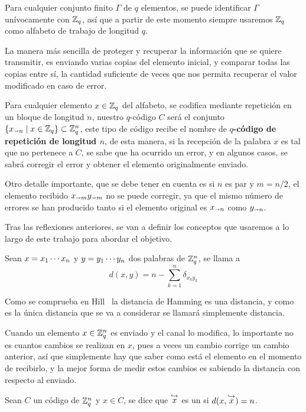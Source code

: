 Para cualquier conjunto finito $\Gamma$ de $q$ elementos, se puede identificar $\Gamma$ unívocamente con $\mathbb{Z}_q$, así que a partir de este momento siempre usaremos $\mathbb{Z}_q$ como alfabeto de trabajo de longitud $q$.

La manera más sencilla de proteger y recuperar la información que se quiere transmitir, es enviando varias copias del elemento inicial, y comparar todas las copias entre sí, la cantidad suficiente de veces que nos permita recuperar el valor modificado en caso de error.

Para cualquier elemento $x\in\mathbb{Z}_q$ del alfabeto, se codifica mediante repetición en un bloque de longitud $n$, nuestro $q$-código $C$ será el conjunto $\left\{x_{\shortrightarrow n}\mid x\in\mathbb{Z}_q\right\}\subset \mathbb{Z}_q^n$, este tipo de código recibe el nombre de \textbf{$q$-código de repetición de longitud $n$}, de esta manera, si la recepción de la palabra $x$ es tal que no pertenece a $C$, se sabe que ha ocurrido un error, y en algunos casos, se sabrá corregir el error y obtener el elemento originalmente enviado.

Otro detalle importante, que se debe tener en cuenta es si $n$ es par y $m=n/2$, el elemento recibido $x_{\shortrightarrow m}y_{\shortrightarrow m}$ no se puede corregir, ya que el mismo número de errores se han producido tanto si el elemento original es $x_{\shortrightarrow n}$ como $y_{\shortrightarrow n}$.

Tras las reflexiones anteriores, se van a definir los conceptos que usaremos a lo largo de este trabajo para abordar el objetivo.

\begin{definition}
	Sean $x=x_1\cdots x_{n}$ y $y=y_1\cdots y_{n}$ dos palabras de $\mathbb{Z}_q^n$, se llama  a
	\[
		d(x, y) = n-\sum_{k=1}^n \delta_{x_k y_k}
	\]
\end{definition}

Como se comprueba en Hill~\cite{hill_first_1980} la distancia de Hamming es una distancia, y como es la única distancia que se va a considerar se llamará simplemente distancia.

Cuando un elemento $x\in\mathbb{Z}_q^n$ es enviado y el canal lo modifica, lo importante no es cuantos cambios se realizan en $x$, pues a veces un cambio corrige un cambio anterior, así que simplemente hay que saber como está el elemento en el momento de recibirlo, y la mejor forma de medir estos cambios es sabiendo la distancia con respecto al enviado.

\begin{definition}
	Sean $C$ un código de $\mathbb{Z}_q^n$ y $x\in C$, se dice que $\stackrel{\hookrightarrow}{x}$ es un  si $d(x, \stackrel{\hookrightarrow}{x})= n$.
\end{definition}


